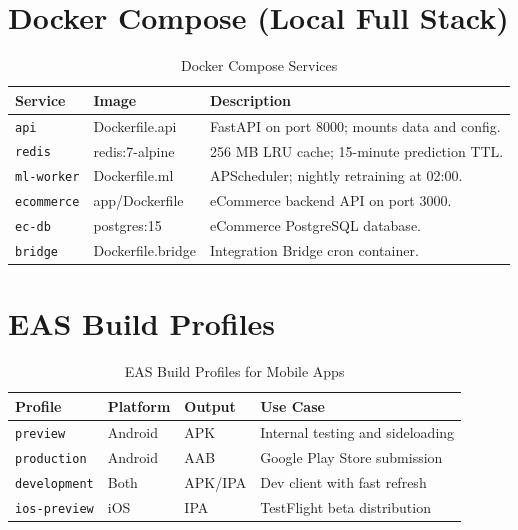\documentclass[12pt, a4paper, oneside]{report}
\begin{document}
\section{Docker Compose (Local Full Stack)}

\begin{table}[H]
\centering
\caption{Docker Compose Services}
\label{tab:docker}
\begin{tabularx}{\textwidth}{@{} L{2.6cm} L{3.0cm} X @{}}
\toprule
\textbf{Service} & \textbf{Image} & \textbf{Description} \\
\midrule
\texttt{api}       & Dockerfile.api    & FastAPI on port 8000; mounts data and config. \\
\texttt{redis}     & redis:7-alpine    & 256 MB LRU cache; 15-minute prediction TTL. \\
\texttt{ml-worker} & Dockerfile.ml     & APScheduler; nightly retraining at 02:00. \\
\texttt{ecommerce} & app/Dockerfile    & eCommerce backend API on port 3000. \\
\texttt{ec-db}     & postgres:15       & eCommerce PostgreSQL database. \\
\texttt{bridge}    & Dockerfile.bridge & Integration Bridge cron container. \\
\bottomrule
\end{tabularx}
\end{table}

\section{EAS Build Profiles}

\begin{table}[H]
\centering
\caption{EAS Build Profiles for Mobile Apps}
\label{tab:eas}
\begin{tabularx}{\textwidth}{@{} L{2.4cm} L{2.2cm} L{1.8cm} X @{}}
\toprule
\textbf{Profile} & \textbf{Platform} & \textbf{Output} & \textbf{Use Case} \\
\midrule
\texttt{preview}    & Android & APK & Internal testing and sideloading \\
\texttt{production} & Android & AAB & Google Play Store submission \\
\texttt{development}& Both    & APK/IPA & Dev client with fast refresh \\
\texttt{ios-preview}& iOS     & IPA & TestFlight beta distribution \\
\bottomrule
\end{tabularx}
\end{table}
\end{document}

